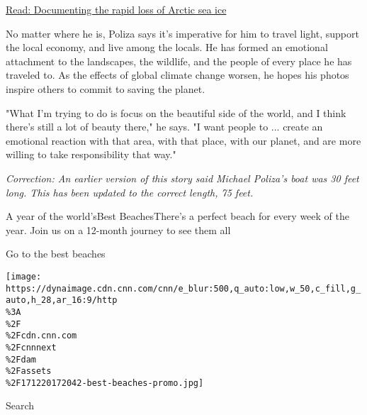 \href{http://www.cnn.com/travel/article/documenting-arctic-ice-melt/index.html}{Read:
Documenting the rapid loss of Arctic sea ice}

No matter where he is, Poliza says it's imperative for him to travel
light, support the local economy, and live among the locals. He has
formed an emotional attachment to the landscapes, the wildlife, and the
people of every place he has traveled to. As the effects of global
climate change worsen, he hopes his photos inspire others to commit to
saving the planet.

"What I'm trying to do is focus on the beautiful side of the world, and
I think there's still a lot of beauty there," he says. "I want people to
... create an emotional reaction with that area, with that place, with
our planet, and are more willing to take responsibility that way."

\emph{Correction: An earlier version of this story said Michael Poliza's
boat was 30 feet long. This has been updated to the correct length, 75
feet.}

\href{//www.cnn.com/interactive/travel/best-beaches}{}

A year of the world'sBest BeachesThere's a perfect beach for every week
of the year. Join us on a 12-month journey to see them all

Go to the best beaches

\texttt{[image: https://dynaimage.cdn.cnn.com/cnn/e\_blur:500,q\_auto:low,w\_50,c\_fill,g\_auto,h\_28,ar\_16:9/http\\\%3A\\\%2F\\\%2Fcdn.cnn.com\\\%2Fcnnnext\\\%2Fdam\\\%2Fassets\\\%2F171220172042-best-beaches-promo.jpg]}

Search

